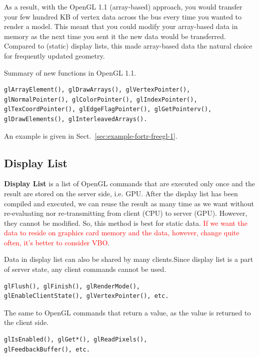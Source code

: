 As a result, with the OpenGL 1.1 (array-based) approach, you would
transfer your few hundred KB of vertex data across the bus every time
you wanted to render a model. This meant that you could modify your
array-based data in memory as the next time you sent it the new data
would be transferred. Compared to (static) display lists, this made
array-based data the natural choice for frequently updated geometry.


Summary of new functions in OpenGL 1.1.
\begin{verbatim}
glArrayElement(), glDrawArrays(), glVertexPointer(), 
glNormalPointer(), glColorPointer(), glIndexPointer(), 
glTexCoordPointer(), glEdgeFlagPointer(), glGetPointerv(), 
glDrawElements(), glInterleavedArrays().
\end{verbatim}

An example is given in Sect.~\ref{sec:example-fortr-freegl-1}. 

\subsection{Display List}
\label{sec:display-list}


{\bf Display List} is a list of OpenGL commands that are executed only
once and the result are stored on the server side, i.e. GPU. After the
display list has been compiled and executed, we can reuse the result
as many time as we want without re-evaluating nor re-transmitting from
client (CPU) to server (GPU). However, they cannot be modified. So,
this method is best for static data.
\textcolor{red}{If we want the data to reside on graphics card memory
  and the data, however, change quite often, it's better to consider
  VBO}.

Data in display list can also be shared by many clients.Since display
list is a part of server state, any client commands cannot be used.
\begin{verbatim}
glFlush(), glFinish(), glRenderMode(), 
glEnableClientState(), glVertexPointer(), etc. 
\end{verbatim}
The same to OpenGL commands that return a value, as the value is
returned to the client side.
\begin{verbatim}
glIsEnabled(), glGet*(), glReadPixels(), 
glFeedbackBuffer(), etc.
\end{verbatim}


